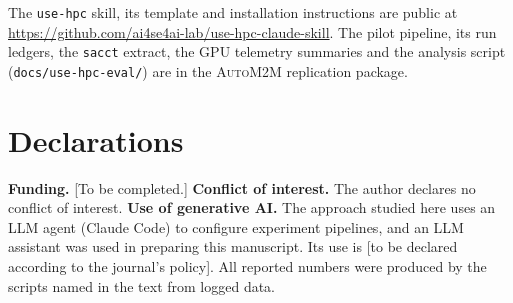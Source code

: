 \documentclass[pdflatex,sn-mathphys-num]{sn-jnl}
\theoremstyle{thmstyleone}%
\theoremstyle{thmstyletwo}%
\theoremstyle{thmstylethree}%
\newcommand{\skill}{\texttt{use-hpc}}
\newcommand{\auto}{\textsc{AutoM2M}}
\newcommand{\code}[1]{\texttt{#1}}
\begin{document}
The \skill{} skill, its template and installation instructions are public at
\url{https://github.com/ai4se4ai-lab/use-hpc-claude-skill}. The pilot
pipeline, its run ledgers, the \code{sacct} extract, the GPU telemetry
summaries and the analysis script (\code{docs/use-hpc-eval/}) are in the
\auto{} replication package.

\section*{Declarations}

\textbf{Funding.} [To be completed.]
\textbf{Conflict of interest.} The author declares no conflict of interest.
\textbf{Use of generative AI.} The approach studied here uses an LLM agent
(Claude Code) to configure experiment pipelines, and an LLM assistant was used
in preparing this manuscript. Its use is [to be declared according to the
journal's policy]. All reported numbers were produced by the scripts named in
the text from logged data.


\end{document}
